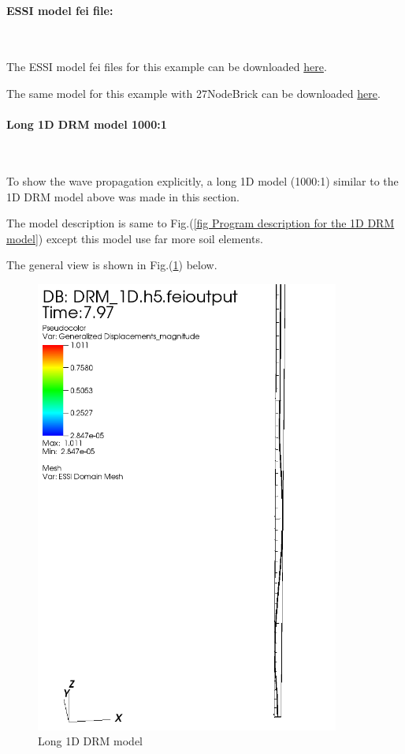 \documentclass[fleqn,11pt]{article}
\begin{document}
\paragraph{ESSI model fei file: } ~



The ESSI model fei files for this example can be downloaded \href{https://github.com/BorisJeremic/Real-ESSI-Examples/blob/master/model_fei_file/8NodeBrick_DRM_1D/8NodeBrick_DRM_1D.tgz?raw=true}{here}.

The same model for this example with 27NodeBrick can be downloaded \href{https://github.com/BorisJeremic/Real-ESSI-Examples/blob/master/model_fei_file/27NodeBrick_DRM_1D/27NodeBrick_DRM_1D.tgz?raw=true}{here}.

\newpage
\paragraph{Long 1D DRM model 1000:1 } ~

To show the wave propagation explicitly, a long 1D model (1000:1) similar to the 1D DRM model above was made in this section.

The model description is same to Fig.(\ref{fig Program description for the 1D DRM model}) except this model use far more soil elements. 

The general view is shown in Fig.(\ref{fig_Long 1D DRM model}) below. 

\begin{figure}[H]
  \centering
  \includegraphics[width=10cm]{../Figure-files/long_DRM_full.png}
  \caption{Long 1D DRM model}
  \label{fig_Long 1D DRM model}
\end{figure}
\end{document}
